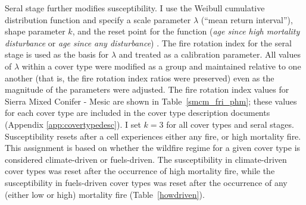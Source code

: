 \begin{itemize}
\begin{table}[htbp]
\end{table}

Seral stage further modifies susceptibility. I use the Weibull cumulative distribution function and specify a scale parameter $\lambda$ (``mean return interval''), shape parameter $k$, and the reset point for the function (\emph{age since high mortality disturbance} or \emph{age since any disturbance}) \citep{Johnson1985}. The fire rotation index for the seral stage is used as the basis for $\lambda$ and treated as a calibration parameter. All values of $\lambda$ within a cover type were modified as a group and maintained relative to one another (that is, the fire rotation index ratios were preserved) even as the magnitude of the parameters were adjusted. The fire rotation index values for Sierra Mixed Conifer - Mesic are shown in Table~\ref{smcm_fri_phm}; these values for each cover type are included in the cover type description documents (Appendix \ref{app:covertypedesc}). I set $k=3$ for all cover types and seral stages. Susceptibility resets after a cell experiences either any fire, or high mortality fire. This assignment is based on whether the wildfire regime for a given cover type is considered climate-driven or fuels-driven. The susceptibility in climate-driven cover types was reset after the occurrence of high mortality fire, while the susceptibility in fuels-driven cover types was reset after the occurrence of any (either low or high) mortality fire (Table~\ref{howdriven}).


\end{itemize}
